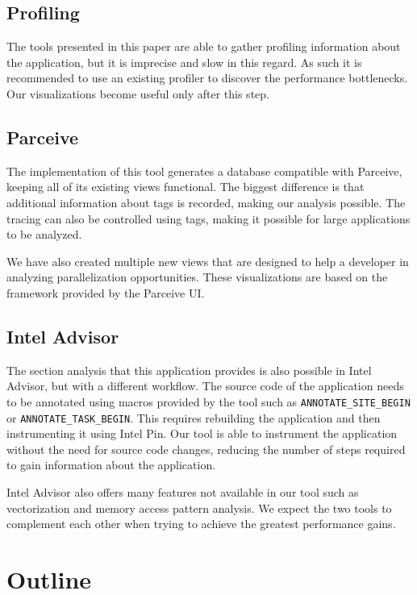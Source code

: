\subsection{Profiling}

The tools presented in this paper are able to gather profiling information about the application, but it is imprecise and slow in this regard. As such it is recommended to use an existing profiler to discover the performance bottlenecks. Our visualizations become useful only after this step.

\subsection{Parceive}

The implementation of this tool generates a database compatible with Parceive, keeping all of its existing views functional. The biggest difference is that additional information about tags is recorded, making our analysis possible. The tracing can also be controlled using tags, making it possible for large applications to be analyzed.

We have also created multiple new views that are designed to help a developer in analyzing parallelization opportunities. These visualizations are based on the framework provided by the Parceive UI.

\subsection{Intel Advisor}

The section analysis that this application provides is also possible in Intel Advisor, but with a different workflow. The source code of the application needs to be annotated using macros provided by the tool such as \texttt{ANNOTATE\_SITE\_BEGIN} or \texttt{ANNOTATE\_TASK\_BEGIN}. This requires rebuilding the application and then instrumenting it using Intel Pin. Our tool is able to instrument the application without the need for source code changes, reducing the number of steps required to gain information about the application.

Intel Advisor also offers many features not available in our tool such as vectorization and memory access pattern analysis. We expect the two tools to complement each other when trying to achieve the greatest performance gains.

\section {Outline}